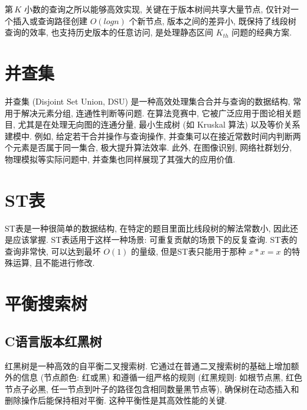 \documentclass[a4paper]{ctexbook}
\begin{document}
第 $K$ 小数的查询之所以能够高效实现, 关键在于版本树间共享大量节点, 仅针对一个插入或查询路径创建 $O(log n)$ 个新节点, 版本之间的差异小, 既保持了线段树查询的效率, 也支持历史版本的任意访问, 是处理静态区间 $K_{th}$ 问题的经典方案.



\section{并查集}

并查集 (Disjoint Set Union, DSU) 是一种高效处理集合合并与查询的数据结构, 常用于解决元素分组, 连通性判断等问题. 在算法竞赛中, 它被广泛应用于图论相关题目, 尤其是在处理无向图的连通分量, 最小生成树 (如 Kruskal 算法) 以及等价关系建模中. 例如, 给定若干合并操作与查询操作, 并查集可以在接近常数时间内判断两个元素是否属于同一集合, 极大提升算法效率. 此外, 在图像识别, 网络社群划分, 物理模拟等实际问题中, 并查集也同样展现了其强大的应用价值.



\section{ST表}

ST表是一种很简单的数据结构, 在特定的题目里面比线段树的解法常数小, 因此还是应该掌握. ST表适用于这样一种场景: 可重复贡献的场景下的反复查询. ST表的查询非常快, 可以达到最坏 $O(1)$ 的量级, 但是ST表只能用于那种 $x*x=x$ 的特殊运算, 且不能进行修改.



\section{平衡搜索树}

\subsection*{C语言版本红黑树}

红黑树是一种高效的自平衡二叉搜索树. 它通过在普通二叉搜索树的基础上增加额外的信息 (节点颜色: 红或黑) 和遵循一组严格的规则 (红黑规则: 如根节点黑, 红色节点子必黑, 任一节点到叶子的路径包含相同数量黑节点等), 确保树在动态插入和删除操作后能保持相对平衡. 这种平衡性是其高效性能的关键.
\end{document}
